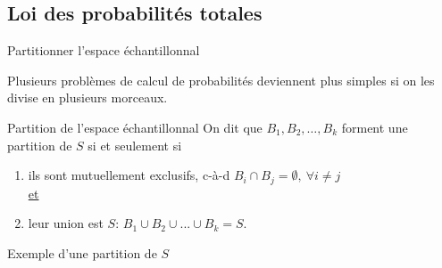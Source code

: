 \documentclass{BeamerTemplate}
\begin{document}

\subsection{Loi des probabilités totales}

\begin{frame}[t]{Partitionner l'espace échantillonnal}

{\small Plusieurs problèmes de calcul de probabilités
 deviennent plus simples si on les divise en
 plusieurs morceaux. %

 \begin{Boite}{Partition de l'espace échantillonnal}
  On dit que $B_1,B_2,\ldots,B_k$ forment une \alert{partition
  de $S$} si et seulement si
  \begin{enumerate}
   \item ils sont mutuellement exclusifs, c-à-d $B_i\cap B_j=\emptyset,\ \forall i\neq j$\\

   \underline{et}
   \item leur union est $S$: $B_1\cup B_2\cup ...\cup B_k=S$.
  \end{enumerate}
 \end{Boite}
}
\end{frame}

\begin{frame}[t]{Exemple d'une partition de $S$}

\begin{center}
\end{center}

\end{frame}
\end{document}

